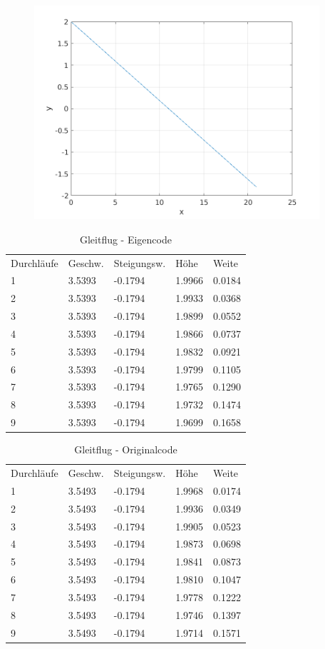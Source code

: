 \documentclass[a4paper,12pt]{scrartcl}
\begin{document}
\begin{figure}[htp]
	\centering
	\includegraphics[width=300pt]{flightpath1.png}
	\label{fig:gleit}
\end{figure}
\begin{table}
\centering
\caption{Gleitflug - Eigencode}
\begin{tabular}{lllll}
Durchläufe & Geschw. & Steigungsw. & Höhe   & Weite   \\
1          & 3.5393  & -0.1794     & 1.9966 & 0.0184  \\
2          & 3.5393  & -0.1794     & 1.9933 & 0.0368  \\
3          & 3.5393  & -0.1794     & 1.9899 & 0.0552  \\
4          & 3.5393  & -0.1794     & 1.9866 & 0.0737  \\
5          & 3.5393  & -0.1794     & 1.9832 & 0.0921  \\
6          & 3.5393  & -0.1794     & 1.9799 & 0.1105  \\
7          & 3.5393  & -0.1794     & 1.9765 & 0.1290  \\
8          & 3.5393  & -0.1794     & 1.9732 & 0.1474  \\
9          & 3.5393  & -0.1794     & 1.9699 & 0.1658 
\end{tabular}
\end{table}
\begin{table}
\centering
\caption{Gleitflug - Originalcode}
\begin{tabular}{lllll}
Durchläufe & Geschw. & Steigungsw. & Höhe   & Weite   \\
1          & 3.5493  & -0.1794     & 1.9968 & 0.0174  \\
2          & 3.5493  & -0.1794     & 1.9936 & 0.0349  \\
3          & 3.5493  & -0.1794     & 1.9905 & 0.0523  \\
4          & 3.5493  & -0.1794     & 1.9873 & 0.0698  \\
5          & 3.5493  & -0.1794     & 1.9841 & 0.0873  \\
6          & 3.5493  & -0.1794     & 1.9810 & 0.1047  \\
7          & 3.5493  & -0.1794     & 1.9778 & 0.1222  \\
8          & 3.5493  & -0.1794     & 1.9746 & 0.1397  \\
9          & 3.5493  & -0.1794     & 1.9714 & 0.1571 
\end{tabular}
\end{table}
\end{document}
